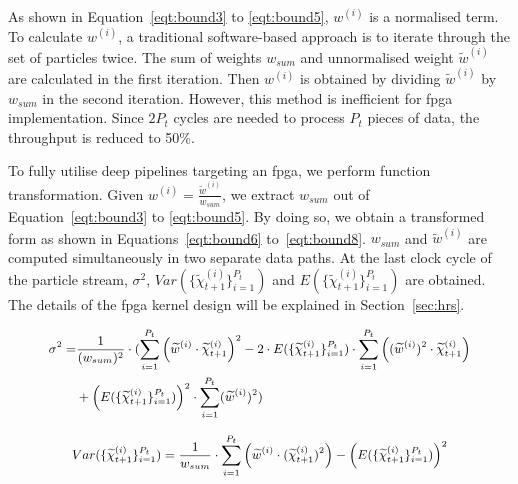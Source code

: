 As shown in Equation~\ref{eqt:bound3} to \ref{eqt:bound5}, ${w}^{(i)}$ is a normalised term. 
To calculate $w^{(i)}$, a traditional software-based approach is to iterate through the set of particles twice.
The sum of weights $w_{sum}$ and unnormalised weight $\widetilde{w}^{(i)}$ are calculated in the first iteration.
Then $w^{(i)}$ is obtained by dividing $\widetilde{w}^{(i)}$ by $w_{sum}$ in the second iteration.
However, this method is inefficient for \gls{fpga} implementation.
Since $2P_t$ cycles are needed to process $P_t$ pieces of data, the throughput is reduced to 50\%.

To fully utilise deep pipelines targeting an \gls{fpga}, we perform function transformation.
Given ${w}^{(i)} = \frac{\widetilde{w}^{(i)}}{w_{sum}}$, we extract $w_{sum}$ out of Equation~\ref{eqt:bound3} to \ref{eqt:bound5}.
By doing so, we obtain a transformed form as shown in Equations~\ref{eqt:bound6} to~\ref{eqt:bound8}.
$w_{sum}$ and $\widetilde{w}^{(i)}$ are computed simultaneously in two separate data paths.
At the last clock cycle of the particle stream, $\sigma^2$, $Var(\{\widetilde{\chi}_{t+1}^{(i)}\}^{P_t}_{i=1})$ and $E(\{\widetilde{\chi}_{t+1}^{(i)}\}^{P_t}_{i=1})$ are obtained.
The details of the \gls{fpga} kernel design will be explained in Section~\ref{sec:hrs}.

\begin{eqnarray}
\small
\begin{aligned}
\sigma^2 = & \frac{1}{(w_{sum})^2} \cdot ( \sum_{i=1}^{P_{t}}\left(\widetilde{w}^{(i)} \cdot \widetilde{\chi}_{t+1}^{(i)} \right)^2 - 2 \cdot E(\{\widetilde{\chi}_{t+1}^{(i)}\}^{P_t}_{i=1}) \cdot \sum_{i=1}^{P_{t}} \left ( (\widetilde{w}^{(i)})^2 \cdot \widetilde{\chi}_{t+1}^{(i)} \right )\\
& + \left(E(\{\widetilde{\chi}_{t+1}^{(i)}\}^{P_t}_{i=1})\right)^2 \cdot \sum_{i=1}^{P_{t}}(\widetilde{w}^{(i)})^2 )
\end{aligned}
\label{eqt:bound6}
\end{eqnarray}

\begin{equation}
\small
\begin{aligned}
Var(\{\widetilde{\chi}_{t+1}^{(i)}\}^{P_t}_{i=1}) = \frac{1}{w_{sum}} \cdot \sum_{i=1}^{P_{t}} \left ( \widetilde{w}^{(i)} \cdot (\widetilde{\chi}_{t+1}^{(i)})^2 \right ) - \left( E(\{\widetilde{\chi}_{t+1}^{(i)}\}^{P_t}_{i=1}) \right)^2
\end{aligned}
\label{eqt:bound7}
\end{equation}

